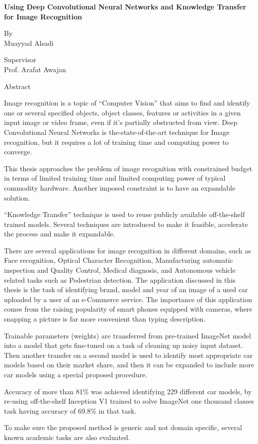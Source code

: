 {\fontsize{16pt}{24pt}\selectfont
\begin{center}\bfseries
Using Deep Convolutional Neural Networks and Knowledge Transfer for Image Recognition

By\\
Muayyad Alsadi

Supervisor\\
Prof. Arafat Awajan

Abstract
\end{center}
}

Image recognition is a topic of ``Computer Vision''
that aims to find and identify one or several specified objects, object classes, features or activities
in a given input image or video frame, even if it's partially obstructed from view.
Deep Convolutional Neural Networks is the-state-of-the-art technique for Image recognition,
but it requires a lot of training time and computing power to converge.

This thesis approaches the problem of image recognition with constrained budget in terms of
limited training time and limited computing power of typical commodity hardware.
Another imposed constraint is to have an expandable solution.

``Knowledge Transfer'' technique is used to reuse publicly available off-the-shelf trained models.
Several techniques are introduced to make it feasible, accelerate the process and make it expandable.

There are several applications for image recognition in different domains, such as
Face recognition, Optical Character Recognition, Manufacturing automatic inspection and Quality Control,
Medical diagnosis, and Autonomous vehicle related tasks such as Pedestrian detection.
The application discussed in this thesis is the task of identifying
brand, model and year of an image of a used car uploaded by a user of an e-Commerce service.
The importance of this application comes from the raising popularity of smart phones
equipped with cameras, where snapping a picture is far more convenient than typing description.

Trainable parameters (weights) are transferred from pre-trained ImageNet model into a model
that gets fine-tuned on a task of cleaning up noisy input dataset.
Then another transfer on a second model is used to identify most appropriate car models based on their market share,
and then it can be expanded to include more car models using a special proposed procedure.

Accuracy of more than 81\%  was achieved identifying 229 different car models,
by re-using off-the-shelf Inception V1 trained to solve ImageNet one thousand classes task having
accuracy of 69.8\% in that task.

To make sure the proposed method is generic and not domain specific,
several known academic tasks are also evaluated.

